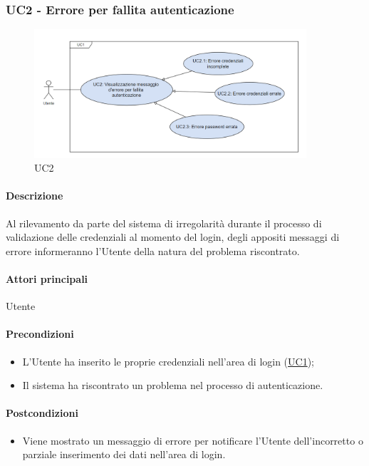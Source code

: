 \subsubsection{UC2 - Errore per fallita autenticazione}\label{UC2}

\begin{figure}[H]
  \centering
  \includegraphics[width=0.90\textwidth]{assets/uc2.png}
  \caption{UC2}
\end{figure}

\paragraph*{Descrizione}
Al rilevamento da parte del sistema di irregolarità durante il processo di validazione delle credenziali al momento del login, degli appositi messaggi di errore informeranno l’Utente della natura del problema riscontrato.

\paragraph*{Attori principali}
Utente

\paragraph*{Precondizioni}
\begin{itemize}
  \item L’Utente ha inserito le proprie credenziali nell’area di login (\hyperref[UC1]{UC1});
  \item Il sistema ha riscontrato un problema nel processo di autenticazione.  
\end{itemize}

\paragraph*{Postcondizioni}
\begin{itemize}
  \item Viene mostrato un messaggio di errore per notificare l’Utente dell’incorretto o parziale inserimento dei dati nell’area di login.
\end{itemize}

